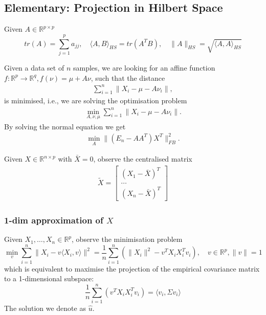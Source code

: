 \subsection{Elementary: Projection in Hilbert Space}
\begin{definition}
Given $A \in \mathbb{R}^{p \times p} $
\begin{equation*}
	tr (A) = \sum_{j = 1}^p a_{jj}, \quad \langle A, B \rangle_{HS} = tr(A^TB), \quad \|A\|_{HS} = \sqrt{\langle A, A \rangle_{HS}}
\end{equation*}
\end{definition}
Given a data set of $n$ samples, we are looking for an affine function $f: \mathbb{R}^p \rightarrow \mathbb{R}^q, f(\nu) = \mu + A \nu$, such that the distance
\begin{align*}
	\sum_{i = 1}^n \|X_i - \mu - A\nu_i\|,
\end{align*} 
is minimised, i.e., we are solving the optimisation problem
\begin{align*}
	\min_{A, \nu, \mu} \sum_{i = 1}^n \|X_i - \mu - A\nu_i\|.
\end{align*}
By solving the normal equation we get 
\begin{align*}
	\min_{A}\|(E_n - AA^T)X^T\|_{FB}^2. 
\end{align*}


\begin{definition}
	Given $X \in \mathbb{R}^{n \times p}$ with $\bar{X} = 0$, observe the centralised matrix
	\begin{align*}
		\tilde{X} = 
		\begin{bmatrix}
			(X_1 - \bar{X})^T \\
			\dots\\
			(X_n - \bar{X})^T
		\end{bmatrix}
	\end{align*}
\end{definition}

\subsubsection*{1-dim approximation of $X$}
Given $X_1, \dots, X_n \in \mathbb{R}^p$, observe the minimisation problem
\begin{equation}
	\min_v  \sum_{i = 1}^n \| X_i - v \langle X_i, v \rangle \|^2 = \frac{1}{n} \sum_{i = 1}^n ( \|X_i \|^2 - v^T X_iX_i^T v_i), \quad v \in \mathbb{R}^p, \|v\| = 1
\end{equation}
which is equivalent to maximise the projection of the empirical covariance matrix to a 1-dimensional subspace:
\begin{equation}\label{PCA 1. :OF}
	\frac{1}{n} \sum_{i = 1}^n ( v^T X_iX_i^T v_i) = \langle v_i, \hat{\Sigma} v_i \rangle
\end{equation}
The solution we denote as $\hat{u}$.


